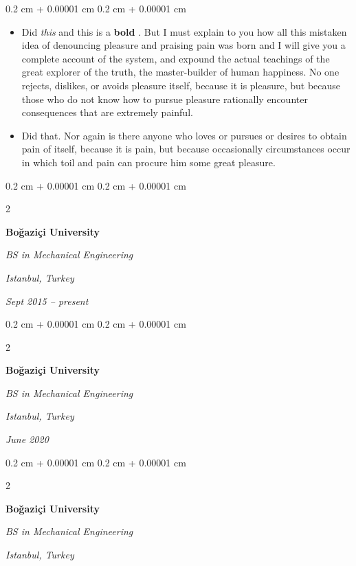 \documentclass[10pt, letterpaper]{article}
\newenvironment{highlights}{
    \begin{itemize}[
        topsep=0.10 cm,
        parsep=0.10 cm,
        partopsep=0pt,
        itemsep=0pt,
        leftmargin=0.4 cm + 10pt
    ]
}{
    \end{itemize}
} %
\newenvironment{onecolentry}{
    \begin{adjustwidth}{
        0.2 cm + 0.00001 cm
    }{
        0.2 cm + 0.00001 cm
    }
}{
    \end{adjustwidth}
} %
\newenvironment{twocolentry}[2][]{
    \onecolentry
    \def\secondColumn{#2}
    \setcolumnwidth{\fill, 4.5 cm}
    \begin{paracol}{2}
}{
    \switchcolumn \raggedleft \secondColumn
    \end{paracol}
    \endonecolentry
} %
\let\hrefWithoutArrow\href
\renewcommand{\href}[2]{\hrefWithoutArrow{#1}{\ifthenelse{\equal{#2}{}}{ }{#2 }\raisebox{.15ex}{\footnotesize \faExternalLink*}}}
\begin{document}
        \vspace{0.10 cm}
        \begin{onecolentry}
            \begin{highlights}
                \item Did \textit{this} and this is a \textbf{bold} \href{https://example.com}{link}. But I must explain to you how all this mistaken idea of denouncing pleasure and praising pain was born and I will give you a complete account of the system, and expound the actual teachings of the great explorer of the truth, the master-builder of human happiness. No one rejects, dislikes, or avoids pleasure itself, because it is pleasure, but because those who do not know how to pursue pleasure rationally encounter consequences that are extremely painful.
                \item Did that. Nor again is there anyone who loves or pursues or desires to obtain pain of itself, because it is pain, but because occasionally circumstances occur in which toil and pain can procure him some great pleasure.
            \end{highlights}
        \end{onecolentry}


        \vspace{0.2 cm}

        \begin{twocolentry}{
        \textit{Istanbul, Turkey}    
            
        \textit{Sept 2015 – present}}
            \textbf{Boğaziçi University}

            \textit{BS in Mechanical Engineering}
        \end{twocolentry}



        \vspace{0.2 cm}

        \begin{twocolentry}{
        \textit{Istanbul, Turkey}    
            
        \textit{June 2020}}
            \textbf{Boğaziçi University}

            \textit{BS in Mechanical Engineering}
        \end{twocolentry}



        \vspace{0.2 cm}

        \begin{twocolentry}{
        \textit{Istanbul, Turkey}    
            
        }
            \textbf{Boğaziçi University}

            \textit{BS in Mechanical Engineering}
        \end{twocolentry}
\end{document}
